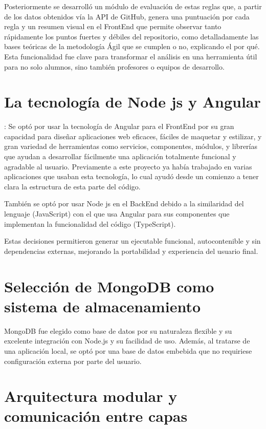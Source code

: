 Posteriormente se desarrolló un módulo de evaluación de estas reglas que, a partir de los datos obtenidos vía la API de GitHub, genera una puntuación por cada regla y un resumen visual en el FrontEnd que permite observar tanto rápidamente los puntos fuertes y débiles del repositorio, como detalladamente las bases teóricas de la metodología Ágil que se cumplen o no, explicando el por qué. Esta funcionalidad fue clave para transformar el análisis en una herramienta útil para no solo alumnos, sino también profesores o equipos de desarrollo.

\section{La tecnología de Node js y Angular}: Se optó por usar la tecnología de Angular para el FrontEnd por su gran capacidad para diseñar aplicaciones web eficaces, fáciles de maquetar y estilizar, y gran variedad de herramientas como servicios, componentes, módulos, y librerías que ayudan a desarrollar fácilmente una aplicación totalmente funcional y agradable al usuario. Previamente a este proyecto ya había trabajado en varias aplicaciones que usaban esta tecnología, lo cual ayudó desde un comienzo a tener clara la estructura de esta parte del código.

También se optó por usar Node js en el BackEnd debido a la similaridad del lenguaje (JavaScript) con el que usa Angular para sus componentes que implementan la funcionalidad del código (TypeScript).

Estas decisiones permitieron generar un ejecutable funcional, autocontenible y sin dependencias externas, mejorando la portabilidad y experiencia del usuario final.

\section{Selección de MongoDB como sistema de almacenamiento}

MongoDB fue elegido como base de datos por su naturaleza flexible y su excelente integración con Node.js y su facilidad de uso. Además, al tratarse de una aplicación local, se optó por una base de datos embebida que no requiriese configuración externa por parte del usuario.

\section{Arquitectura modular y comunicación entre capas}

